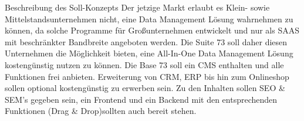 Beschreibung des Soll-Konzepts
	Der jetzige Markt erlaubt es Klein- sowie Mittelstandsunternehmen nicht, eine Data Management Lösung wahrnehmen zu können, da solche Programme für Großunternehmen entwickelt und nur als SAAS mit beschränkter Bandbreite angeboten werden.
	Die Suite 73 soll daher diesen Unternehmen die Möglichkeit bieten, eine All-In-One Data Management Lösung kostengünstig nutzen zu können.
	Die Base 73 soll ein CMS enthalten und alle Funktionen frei anbieten. Erweiterung von CRM, ERP bis hin zum Onlineshop sollen optional kostengünstig zu erwerben sein.
	Zu den Inhalten sollen SEO & SEM's gegeben sein, ein Frontend und ein Backend  mit den entsprechenden Funktionen (Drag & Drop)sollten auch bereit stehen.